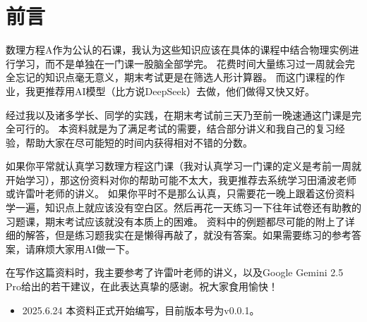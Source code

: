 \chapter*{前言}
数理方程A作为公认的石课，我认为这些知识应该在具体的课程中结合物理实例进行学习，而不是单独在一门课一股脑全部学完。
花费时间大量练习过一周就会完全忘记的知识点毫无意义，期末考试更是在筛选人形计算器。
而这门课程的作业，我更推荐用AI模型（比方说DeepSeek）去做，他们做得又快又好。

经过我以及诸多学长、同学的实践，在期末考试前三天乃至前一晚速通这门课是完全可行的。
本资料就是为了满足考试的需要，结合部分讲义和我自己的复习经验，帮助大家在尽可能短的时间内获得相对不错的分数。

如果你平常就认真学习数理方程这门课（我对认真学习一门课的定义是考前一周就开始学习），那这份资料对你的帮助可能不太大，我更推荐去系统学习田涌波老师或许雷叶老师的讲义。
如果你平时不是那么认真，只需要花一晚上跟着这份资料学一遍，知识点上就应该没有空白区。然后再花一天练习一下往年试卷还有助教的习题课，期末考试应该就没有本质上的困难。
资料中的例题都尽可能的附上了详细的解答，但是练习题我实在是懒得再敲了，就没有答案。如果需要练习的参考答案，请麻烦大家用AI做一下。

在写作这篇资料时，我主要参考了许雷叶老师的讲义，以及Google Gemini 2.5 Pro给出的若干建议，在此表达真挚的感谢。祝大家食用愉快！

\begin{itemize}
    \item 2025.6.24 本资料正式开始编写，目前版本号为v0.0.1。
\end{itemize}
